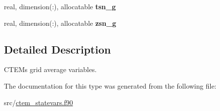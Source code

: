 \begin{DoxyCompactItemize}
\item 
\hypertarget{structctem__statevars_1_1ctem__gridavg_ae4eef370e8269c4dfbf8f771331ceb1a}{}real, dimension(\+:), allocatable {\bfseries tsn\+\_\+g}\label{structctem__statevars_1_1ctem__gridavg_ae4eef370e8269c4dfbf8f771331ceb1a}

\item 
\hypertarget{structctem__statevars_1_1ctem__gridavg_a190bd9e2456bc9d89c70f9bebce80b83}{}real, dimension(\+:), allocatable {\bfseries zsn\+\_\+g}\label{structctem__statevars_1_1ctem__gridavg_a190bd9e2456bc9d89c70f9bebce80b83}

\end{DoxyCompactItemize}


\subsection{Detailed Description}
C\+T\+E\+M\textquotesingle{}s grid average variables. 

The documentation for this type was generated from the following file\+:\begin{DoxyCompactItemize}
\item 
src/\hyperlink{ctem__statevars_8f90}{ctem\+\_\+statevars.\+f90}\end{DoxyCompactItemize}
